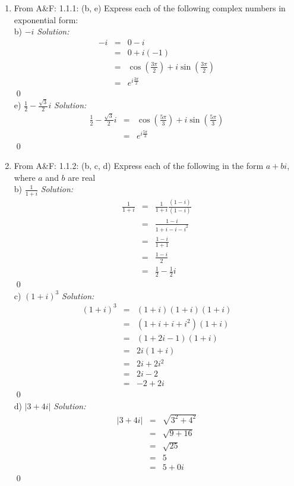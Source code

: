 \documentclass[10pt]{amsart}
\theoremstyle{nonumberplain}
\begin{document}
\mline
\begin{enumerate}[label={\bf {\arabic*}:}]
\item  From A\&F: 1.1.1: (b, e)
Express each of the following complex numbers in exponential form: \\
b) $-i$
\textit{Solution:}
\begin{eqnarray*}
-i &=& 0 -i \\
   &=& 0 + i(-1) \\
   &=& \cos(\frac{3\pi}{2}) + i \sin(\frac{3\pi}{2}) \\
   &=& e^{i\frac{3\pi}{2}}
\end{eqnarray*}
\qed \\
e) $\frac{1}{2}-\frac{\sqrt{3}}{2}i$
\textit{Solution:}
\begin{eqnarray*}
\frac{1}{2} - \frac{\sqrt{3}}{2}i &=& \cos(\frac{5\pi}{3}) + i \sin(\frac{5\pi}{3}) \\
					    &=& e^{i\frac{5\pi}{3}}
\end{eqnarray*}
\qed \\

\item From A\&F: 1.1.2: (b, c, d)
Express each of the following in the form $a + bi$, where $a$ and $b$ are real \\
b) $\frac{1}{1 + i}$
\textit{Solution:}
\begin{eqnarray*}
\frac{1}{1 + i} &=& \frac{1}{1 + i} \frac{(1 - i)}{(1 - i)} \\
		     &=& \frac{1 - i}{1 + i - i - i^2} \\
		     &=& \frac{1 - i}{1 + 1} \\
		     &=& \frac{1 - i}{2} \\
		     &=& \frac{1}{2} - \frac{1}{2}i
\end{eqnarray*}
\qed \\
c) $(1 + i)^3$
\textit{Solution:}
\begin{eqnarray*}
(1 + i)^3 &=& (1 + i)(1 + i)(1 + i) \\
              &=& (1 + i + i + i^2)(1 + i) \\ 
              &=& (1 + 2i - 1)(1 + i) \\
              &=& 2i(1 + i) \\
              &=& 2i + 2i^2 \\
              &=& 2i - 2 \\
              &=& -2 + 2i
\end{eqnarray*}
\qed \\
d) $|3 + 4i|$
\textit{Solution:}
\begin{eqnarray*}
|3 + 4i| &=& \sqrt{3^2 + 4^2} \\
              &=& \sqrt{9 + 16} \\ 
              &=& \sqrt{25} \\
              &=& 5 \\
              &=& 5 + 0i
\end{eqnarray*}
\qed \\



\end{enumerate}
\end{document}
